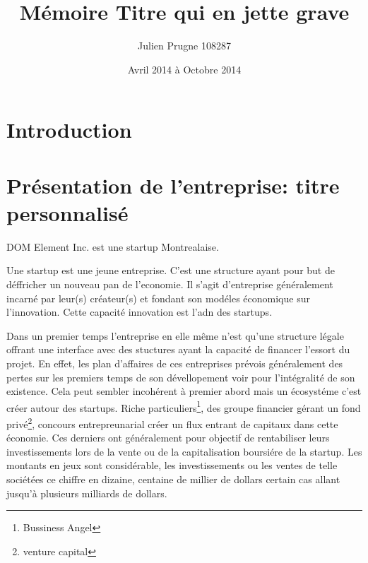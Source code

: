\documentclass[11pt, a4paper ]{article}
\title{Mémoire Titre qui en jette grave}
\author{Julien Prugne 108287}
\date{Avril 2014 à Octobre 2014}
\let\stdsection\section
\renewcommand\section{\newpage\stdsection}
\begin{document}
	\maketitle
	\tableofcontents

	
	\section{Introduction} %



	\section{Présentation de l'entreprise: titre personnalisé} %

DOM Element Inc. est une startup Montrealaise.

Une startup\cite{theseStartup} est une jeune entreprise. C'est une structure ayant pour but de déffricher un nouveau pan de l'economie. Il s'agit d'entreprise généralement incarné par leur(s) créateur(s) et fondant son modéles économique sur l'innovation. Cette capacité innovation est l'adn des startups.

Dans un premier temps l'entreprise en elle même n'est qu'une structure légale offrant une interface avec des stuctures ayant la capacité de financer l'essort du projet. En effet, les plan d'affaires de ces entreprises prévois généralement des pertes sur les premiers temps de son dévellopement voir pour l'intégralité de son existence. Cela peut sembler incohérent à premier abord mais un écosystéme c'est créer autour des startups. Riche particuliers\footnote{Bussiness Angel}, des groupe financier gérant un fond privé\footnote{venture capital}, concours entrepreunarial créer un flux entrant de capitaux dans cette économie. Ces derniers ont généralement pour objectif de rentabiliser leurs investissements lors de la vente ou de la capitalisation boursiére de la startup. Les montants en jeux sont considérable, les investissements ou les ventes de telle sociétées ce chiffre en dizaine, centaine de millier de dollars certain cas allant jusqu'à plusieurs milliards de dollars.
\end{document}
